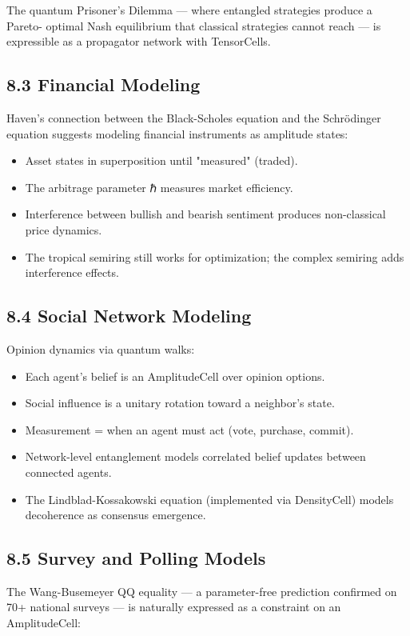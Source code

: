 \documentclass[11pt]{article}
\begin{document}
The quantum Prisoner's Dilemma --- where entangled strategies produce a Pareto-
optimal Nash equilibrium that classical strategies cannot reach --- is expressible
as a propagator network with TensorCells.
\subsection{8.3 Financial Modeling}
\label{sec:org10d55b5}

Haven's connection between the Black-Scholes equation and the Schrödinger equation
suggests modeling financial instruments as amplitude states:

\begin{itemize}
\item Asset states in superposition until "measured" (traded).
\item The arbitrage parameter ℏ measures market efficiency.
\item Interference between bullish and bearish sentiment produces non-classical
price dynamics.
\item The tropical semiring still works for optimization; the complex semiring
adds interference effects.
\end{itemize}
\subsection{8.4 Social Network Modeling}
\label{sec:org7e33fb0}

Opinion dynamics via quantum walks:

\begin{itemize}
\item Each agent's belief is an AmplitudeCell over opinion options.
\item Social influence is a unitary rotation toward a neighbor's state.
\item Measurement = when an agent must act (vote, purchase, commit).
\item Network-level entanglement models correlated belief updates between connected
agents.
\item The Lindblad-Kossakowski equation (implemented via DensityCell) models
decoherence as consensus emergence.
\end{itemize}
\subsection{8.5 Survey and Polling Models}
\label{sec:org34688df}

The Wang-Busemeyer QQ equality --- a parameter-free prediction confirmed on
70+ national surveys --- is naturally expressed as a constraint on an
AmplitudeCell:
\end{document}
